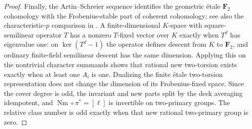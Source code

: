 \begin{proof}
Finally, the Artin--Schreier sequence identifies the geometric
\'etale $\mathbf F_2$ cohomology with the Frobenius-stable part
of coherent cohomology; see also the characteristic-$p$
comparison in \cite[Section 9]{MilneJac}. A finite-dimensional
$K$-space with square-semilinear operator $T$ has a nonzero
$T$-fixed vector over $K$ exactly when $T^d$ has eigenvalue one:
on $\ker(T^d-1)$ the operator defines descent from $K$ to
$\mathbf F_2$, and ordinary finite-field semilinear descent
has the same dimension. Applying this on the nontrivial
character summands shows that rational new two-torsion exists
exactly when at least one $A_i$ is one. Dualizing the finite
\'etale two-torsion representation does not change the dimension
of its Frobenius-fixed space. Since the cover degree is odd,
the invariant and new parts split by the deck averaging
idempotent, and $\operatorname{Nm}\circ\pi^*=[\ell]$ is invertible
on two-primary groups. The relative class number is odd
exactly when that new rational two-primary group is zero.
\end{proof}

